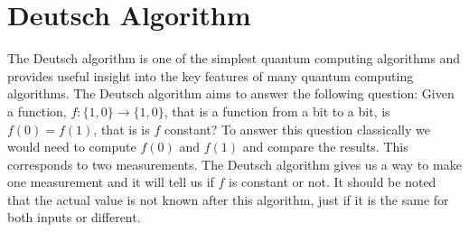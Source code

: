     \section{Deutsch Algorithm}
    The Deutsch algorithm is one of the simplest quantum computing algorithms and provides useful insight into the key features of many quantum computing algorithms.
    The Deutsch algorithm aims to answer the following question: Given a function, \(f\colon\{1, 0\} \to \{1, 0\}\), that is a function from a bit to a bit, is \(f(0) = f(1)\), that is is \(f\) constant?
    To answer this question classically we would need to compute \(f(0)\) and \(f(1)\) and compare the results.
    This corresponds to two measurements.
    The Deutsch algorithm gives us a way to make one measurement and it will tell us if \(f\) is constant or not.
    It should be noted that the actual value is not known after this algorithm, just if it is the same for both inputs or different.
    
